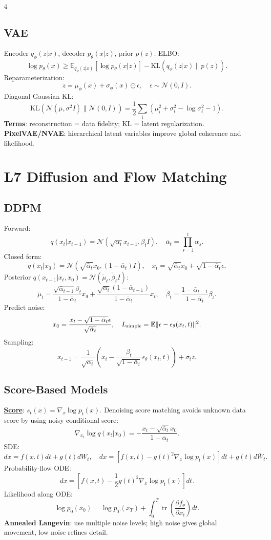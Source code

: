 \documentclass{article}
\newcommand{\key}[1]{\textbf{#1}}
\newcommand{\lowterm}[1]{\textbf{\underline{#1}}}
\newcommand{\E}{\mathbb{E}}
\newcommand{\N}{\mathcal{N}}
\newcommand{\KL}{\mathrm{KL}}
\newcommand{\1}{\mathbf 1}
\DeclareMathOperator{\tr}{tr}
\begin{document}
\begin{multicols*}{4}
\subsection{VAE}
Encoder $q_\phi(z|x)$, decoder $p_\theta(x|z)$, prior $p(z)$. ELBO:
\[
\log p_\theta(x)\ge \E_{q_\phi(z|x)}[\log p_\theta(x|z)]-\KL(q_\phi(z|x)\|p(z)).
\]
Reparameterization:
\[
z=\mu_\phi(x)+\sigma_\phi(x)\odot\epsilon,\quad \epsilon\sim\N(0,I).
\]
Diagonal Gaussian KL:
\[
\KL(\N(\mu,\sigma^2I)\|\N(0,I))
=\frac12\sum_i(\mu_i^2+\sigma_i^2-\log\sigma_i^2-1).
\]
\key{Terms}: reconstruction = data fidelity; KL = latent regularization. \key{PixelVAE/NVAE}: hierarchical latent variables improve global coherence and likelihood.

\section{L7 Diffusion and Flow Matching}
\subsection{DDPM}
Forward:
\[
q(x_t|x_{t-1})=\N(\sqrt{\alpha_t}x_{t-1},\beta_tI),\quad \bar\alpha_t=\prod_{s=1}^t\alpha_s.
\]
Closed form:
\[
q(x_t|x_0)=\N(\sqrt{\bar\alpha_t}x_0,(1-\bar\alpha_t)I),\quad
x_t=\sqrt{\bar\alpha_t}x_0+\sqrt{1-\bar\alpha_t}\epsilon.
\]
Posterior $q(x_{t-1}|x_t,x_0)=\N(\tilde\mu_t,\tilde\beta_tI)$:
\[
\tilde\mu_t=\frac{\sqrt{\bar\alpha_{t-1}}\beta_t}{1-\bar\alpha_t}x_0+
\frac{\sqrt{\alpha_t}(1-\bar\alpha_{t-1})}{1-\bar\alpha_t}x_t,\quad
\tilde\beta_t=\frac{1-\bar\alpha_{t-1}}{1-\bar\alpha_t}\beta_t.
\]
Predict noise:
\[
x_0=\frac{x_t-\sqrt{1-\bar\alpha_t}\epsilon}{\sqrt{\bar\alpha_t}},\quad
L_{\rm simple}=\E\|\epsilon-\epsilon_\theta(x_t,t)\|^2.
\]
Sampling:
\[
x_{t-1}=\frac{1}{\sqrt{\alpha_t}}\left(x_t-\frac{\beta_t}{\sqrt{1-\bar\alpha_t}}\epsilon_\theta(x_t,t)\right)+\sigma_tz.
\]

\subsection{Score-Based Models}
\lowterm{Score}: $s_t(x)=\nabla_x\log p_t(x)$. Denoising score matching avoids unknown data score by using noisy conditional score:
\[
\nabla_{x_t}\log q(x_t|x_0)=-\frac{x_t-\sqrt{\bar\alpha_t}x_0}{1-\bar\alpha_t}.
\]
SDE:
\[
dx=f(x,t)dt+g(t)dW_t,\quad
dx=[f(x,t)-g(t)^2\nabla_x\log p_t(x)]dt+g(t)d\bar W_t.
\]
Probability-flow ODE:
\[
dx=\left[f(x,t)-\frac12g(t)^2\nabla_x\log p_t(x)\right]dt.
\]
Likelihood along ODE:
\[
\log p_0(x_0)=\log p_T(x_T)+\int_0^T\tr\left(\frac{\partial f_\theta}{\partial x_t}\right)dt.
\]
\key{Annealed Langevin}: use multiple noise levels; high noise gives global movement, low noise refines detail.


\end{multicols*}
\end{document}
